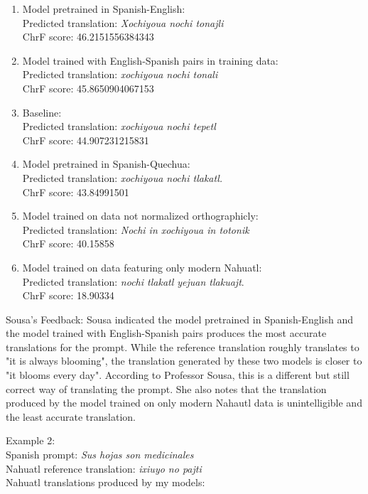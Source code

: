 \documentclass[10pt,twocolumn]{article}
\begin{document}
\begin{enumerate}
    \item Model pretrained in Spanish-English: \\
    Predicted translation: \textit{Xochiyoua nochi tonajli} \\ ChrF score: 46.2151556384343
    \item Model trained with English-Spanish pairs in training data: \\
    Predicted translation: \textit{xochiyoua nochi tonali} \\ ChrF score: 45.8650904067153
    \item Baseline: \\
    Predicted translation: \textit{xochiyoua nochi tepetl}\\ ChrF score: 44.907231215831
    \item Model pretrained in Spanish-Quechua: \\
    Predicted translation: \textit{xochiyoua nochi tlakatl.} \\ ChrF score: 43.84991501
    \item Model trained on data not normalized orthographicly: \\
    Predicted translation: \textit{Nochi in xochiyoua in totonik} \\ ChrF score: 40.15858
    \item Model trained on data featuring only modern Nahuatl: \\
    Predicted translation: \textit{nochi tlakatl yejuan tlakuajt}. \\ ChrF score: 18.90334 
\end{enumerate}

Sousa's Feedback:
Sousa indicated the model pretrained in Spanish-English and the model trained with English-Spanish pairs produces the most accurate translations for the prompt. While the reference translation roughly translates to "it is always blooming", the translation generated by these two models is closer to "it blooms every day". According to Professor Sousa, this is a different but still correct way of translating the prompt. She also notes that the translation produced by the model trained on only modern Nahautl data is unintelligible and the least accurate translation. 


Example 2: \\ 
    Spanish prompt: \textit{Sus hojas son medicinales} \\
    Nahuatl reference translation: \textit{ixiuyo no pajti} \\
    Nahuatl translations produced by my models: \\
\end{document}
